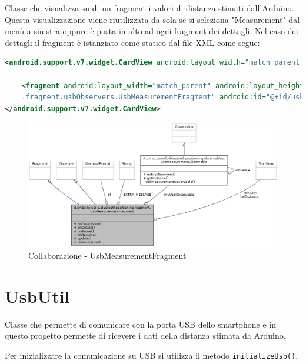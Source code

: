 Classe che visualizza su di un fragment i valori di distanza stimati dall'Arduino. Questa visualizzazione viene riutilizzata da sola se si seleziona "Measurement" dal menù a sinistra oppure è posta in alto ad ogni fragment dei dettagli. Nel caso dei dettagli il fragment è istanziato come statico dal file XML come segue:

\begin{lstlisting}[language=XML]
<android.support.v7.widget.CardView android:layout_width="match_parent"	android:layout_height="wrap_content" android:layout_margin="@dimen/card_margin">

	<fragment android:layout_width="match_parent" android:layout_height="wrap_content" android:name="it.unibo.torsello.bluetoothpositioning
	.fragment.usbObservers.UsbMeasurementFragment" android:id="@+id/usbArduino" tools:layout="@layout/fragment_usb_measurement" />
</android.support.v7.widget.CardView>
\end{lstlisting}

\begin{figure}[ph]
	\centering
	\includegraphics[width=1.6\linewidth,angle=90]{img/uml/class/classit_1_1unibo_1_1torsello_1_1bluetoothpositioning_1_1fragment_1_1UsbMeasurementFragment__coll__graph.png}
	\caption{Collaborazione - UsbMeasurementFragment}
\end{figure}

\newpage
\section{UsbUtil}\label{ch:usb_util}

Classe che permette di comunicare con la porta USB dello smartphone e in questo progetto permette di ricevere i dati della distanza stimata da Arduino. 

Per inizializzare la comunicazione su USB si utilizza il metodo \texttt{initializeUsb()}.
